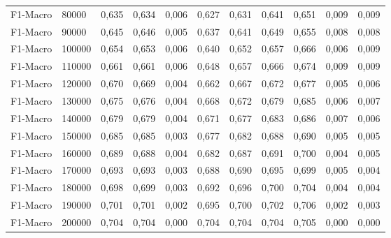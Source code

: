 \begin{longtable}{@{}llrrrrrrrrr@{}}
F1-Macro & 80000 & 0,635 & 0,634 & 0,006 & 0,627 & 0,631 & 0,641 & 0,651 & 0,009 & 0,009 \\
F1-Macro & 90000 & 0,645 & 0,646 & 0,005 & 0,637 & 0,641 & 0,649 & 0,655 & 0,008 & 0,008 \\
F1-Macro & 100000 & 0,654 & 0,653 & 0,006 & 0,640 & 0,652 & 0,657 & 0,666 & 0,006 & 0,009 \\
F1-Macro & 110000 & 0,661 & 0,661 & 0,006 & 0,648 & 0,657 & 0,666 & 0,674 & 0,009 & 0,009 \\
F1-Macro & 120000 & 0,670 & 0,669 & 0,004 & 0,662 & 0,667 & 0,672 & 0,677 & 0,005 & 0,006 \\
F1-Macro & 130000 & 0,675 & 0,676 & 0,004 & 0,668 & 0,672 & 0,679 & 0,685 & 0,006 & 0,007 \\
F1-Macro & 140000 & 0,679 & 0,679 & 0,004 & 0,671 & 0,677 & 0,683 & 0,686 & 0,007 & 0,006 \\
F1-Macro & 150000 & 0,685 & 0,685 & 0,003 & 0,677 & 0,682 & 0,688 & 0,690 & 0,005 & 0,005 \\
F1-Macro & 160000 & 0,689 & 0,688 & 0,004 & 0,682 & 0,687 & 0,691 & 0,700 & 0,004 & 0,005 \\
F1-Macro & 170000 & 0,693 & 0,693 & 0,003 & 0,688 & 0,690 & 0,695 & 0,699 & 0,005 & 0,004 \\
F1-Macro & 180000 & 0,698 & 0,699 & 0,003 & 0,692 & 0,696 & 0,700 & 0,704 & 0,004 & 0,004 \\
F1-Macro & 190000 & 0,701 & 0,701 & 0,002 & 0,695 & 0,700 & 0,702 & 0,706 & 0,002 & 0,003 \\
F1-Macro & 200000 & 0,704 & 0,704 & 0,000 & 0,704 & 0,704 & 0,704 & 0,705 & 0,000 & 0,000 \\

\end{longtable}
